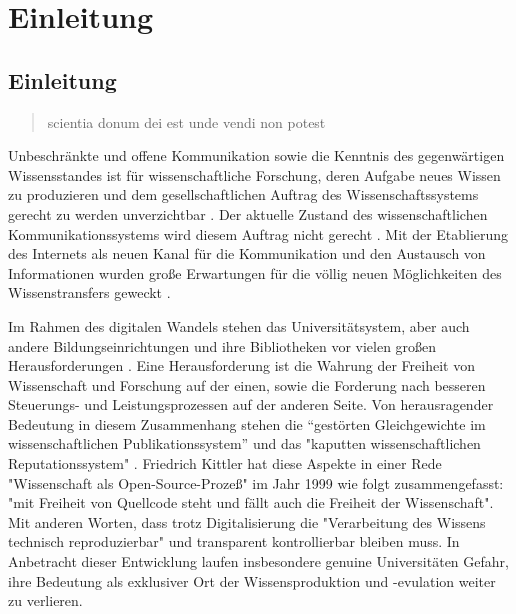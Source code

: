 \chapter{Einleitung} 
\section{Einleitung} 
\begin{quote}
scientia donum dei est unde vendi non potest
\end{quote}Unbeschränkte und offene Kommunikation sowie die Kenntnis des gegenwärtigen Wissensstandes ist für wissenschaftliche Forschung, deren Aufgabe neues Wissen zu produzieren und dem gesellschaftlichen Auftrag des Wissenschaftssystems gerecht zu werden unverzichtbar \cite{Hanekop_2014} \cite{glaeser2006} \cite{gibbons_1994} \cite{Luhmann1998}. Der aktuelle Zustand des wissenschaftlichen Kommunikationssystems wird diesem Auftrag nicht gerecht \cite{suchen}. Mit der Etablierung des Internets als neuen Kanal für die Kommunikation und den Austausch von Informationen wurden große Erwartungen für die völlig neuen Möglichkeiten des Wissenstransfers geweckt \cite{Hanekop_2014} \cite{schulze_2013_open} \cite{albert_2006_open_implications} \cite{Goodrum_2001} \cite{Lawrence_1999}. 

Im Rahmen des digitalen Wandels stehen das Universitätsystem, aber auch andere Bildungseinrichtungen und ihre Bibliotheken vor vielen großen Herausforderungen \cite{Harter2006} \cite{Gu_don_2004} \cite{osterloh2008anreize}. Eine Herausforderung ist die Wahrung der Freiheit von Wissenschaft und Forschung auf der einen,  sowie die Forderung nach besseren Steuerungs- und Leistungsprozessen \cite{Adler_2009} \cite{gibbons_1994} auf der anderen Seite. Von herausragender Bedeutung in diesem Zusammenhang stehen die “gestörten Gleichgewichte im wissenschaftlichen Publikationssystem” \cite{cite:0} und das "kaputten wissenschaftlichen Reputationssystem" \cite{suchen}. Friedrich Kittler hat diese Aspekte in einer Rede "Wissenschaft als Open-Source-Prozeß" im Jahr 1999 wie folgt zusammengefasst: "mit Freiheit von Quellcode steht und fällt auch die Freiheit der Wissenschaft". Mit anderen Worten, dass trotz Digitalisierung die "Verarbeitung des Wissens technisch reproduzierbar" \cite{cite:1} und transparent kontrollierbar \cite{suchen} bleiben muss. In Anbetracht dieser Entwicklung laufen insbesondere genuine Universitäten Gefahr, ihre Bedeutung als exklusiver Ort der Wissensproduktion \cite{suchen} und -evulation \cite{suchen} weiter zu verlieren.

